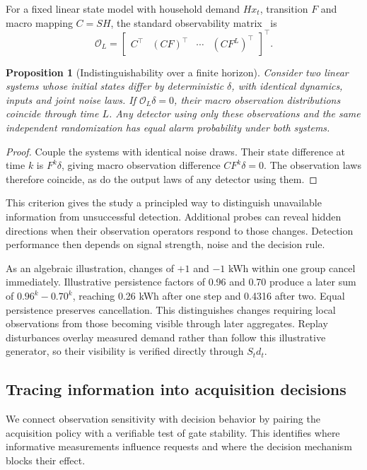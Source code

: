 \documentclass[conference]{IEEEtran}
\newtheorem{proposition}{Proposition}
\begin{document}
For a fixed linear state model with household demand $Hx_t$, transition $F$ and macro mapping $C=SH$, the standard observability matrix~\cite{hespanha} is
\begin{equation}
\mathcal O_L=\begin{bmatrix}C^\top&(CF)^\top&\cdots&(CF^L)^\top\end{bmatrix}^{\!\top}.
\end{equation}
\begin{proposition}[Indistinguishability over a finite horizon]
Consider two linear systems whose initial states differ by deterministic $\delta$, with identical dynamics, inputs and joint noise laws. If $\mathcal O_L\delta=0$, their macro observation distributions coincide through time $L$. Any detector using only these observations and the same independent randomization has equal alarm probability under both systems.
\end{proposition}
\begin{proof}
Couple the systems with identical noise draws. Their state difference at time $k$ is $F^k\delta$, giving macro observation difference $CF^k\delta=0$. The observation laws therefore coincide, as do the output laws of any detector using them.
\end{proof}

This criterion gives the study a principled way to distinguish unavailable information from unsuccessful detection. Additional probes can reveal hidden directions when their observation operators respond to those changes. Detection performance then depends on signal strength, noise and the decision rule.

As an algebraic illustration, changes of $+1$ and $-1$ kWh within one group cancel immediately. Illustrative persistence factors of 0.96 and 0.70 produce a later sum of $0.96^k-0.70^k$, reaching 0.26 kWh after one step and 0.4316 after two. Equal persistence preserves cancellation. This distinguishes changes requiring local observations from those becoming visible through later aggregates. Replay disturbances overlay measured demand rather than follow this illustrative generator, so their visibility is verified directly through $S_t d_t$.







\subsection{Tracing information into acquisition decisions}
We connect observation sensitivity with decision behavior by pairing the acquisition policy with a verifiable test of gate stability. This identifies where informative measurements influence requests and where the decision mechanism blocks their effect.
\end{document}
